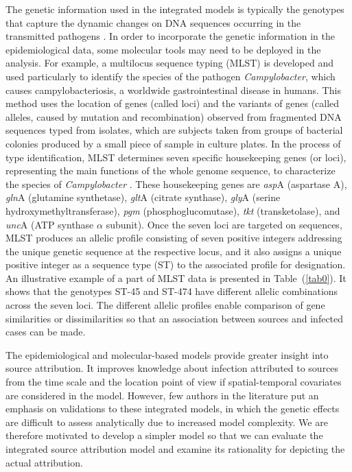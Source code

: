 \documentclass[times, doublespace]{WileyNJD-v2}%
\begin{document}
The genetic information used in the integrated models is typically the genotypes that capture the dynamic changes on DNA sequences occurring in the transmitted pathogens \cite{Cotta}. In order to incorporate the genetic information in the epidemiological data, some molecular tools may need to be deployed in the analysis. For example, a multilocus sequence typing (MLST) \cite{Dingl, Coll} is developed and used particularly to identify the species of the pathogen \textit{Campylobacter}, which causes campylobacteriosis, a worldwide gastrointestinal disease in humans. This method uses the location of genes (called loci) and the variants of genes (called alleles, caused by mutation and recombination) observed from fragmented DNA sequences typed from isolates, which are subjects taken from groups of bacterial colonies produced by a small piece of sample in culture plates. In the process of type identification, MLST determines seven specific housekeeping genes (or loci), representing the main functions of the whole genome sequence, to characterize the species of \textit{Campylobacter} \cite{Urwin}. These housekeeping genes are \textit{asp}A (aspartase A), \textit{gln}A (glutamine synthetase), \textit{glt}A (citrate synthase), \textit{gly}A (serine hydroxymethyltransferase), \textit{pgm} (phosphoglucomutase), \textit{tkt} (transketolase), and \textit{unc}A (ATP synthase $\alpha$ subunit). Once the seven loci are targeted on sequences, MLST produces an allelic profile consisting of seven positive integers addressing the unique genetic sequence at the respective locus, and it also assigns a unique positive integer as a sequence type (ST) to the associated profile for designation. An illustrative example of a part of MLST data is presented in Table~(\ref{tab0}). It shows that the genotypes ST-45 and ST-474 have different allelic combinations across the seven loci. The different allelic profiles enable comparison of gene similarities or dissimilarities so that an association between sources and infected cases can be made.

The epidemiological and molecular-based models provide greater insight into source attribution. It improves knowledge about infection attributed to sources from the time scale and the location point of view if spatial-temporal covariates are considered in the model. However, few authors in the literature put an emphasis on validations to these integrated models, in which the genetic effects are difficult to assess analytically due to increased model complexity. We are therefore motivated to develop a simpler model so that we can evaluate the integrated source attribution model and examine its rationality for depicting the actual attribution. 
\end{document}
